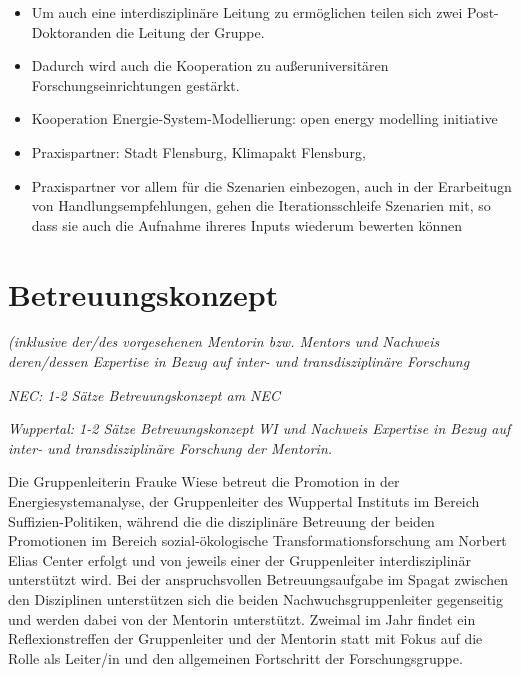 \documentclass[a4paper,11pt,twoside]{scrartcl}
\begin{document}
\begin{itemize}
 \item Um auch eine interdisziplinäre Leitung zu ermöglichen teilen sich zwei Post-Doktoranden die Leitung der Gruppe.
 \item Dadurch wird auch die Kooperation zu außeruniversitären Forschungseinrichtungen gestärkt.
 \item Kooperation Energie-System-Modellierung: open energy modelling initiative
 \item Praxispartner: Stadt Flensburg, Klimapakt Flensburg, 
 \item Praxispartner vor allem für die Szenarien einbezogen, auch in der Erarbeitugn von Handlungsempfehlungen, gehen die Iterationsschleife Szenarien mit, so dass sie auch die Aufnahme ihreres Inputs wiederum bewerten können
\end{itemize}

\section{Betreuungskonzept}
\textit{(inklusive der/des vorgesehenen Mentorin bzw. Mentors und Nachweis deren/dessen Expertise in Bezug auf inter- und transdisziplinäre Forschung}

\textit{NEC: 1-2 Sätze Betreuungskonzept am NEC}

\textit{Wuppertal: 1-2 Sätze Betreuungskonzept WI und Nachweis Expertise in Bezug auf inter- und transdisziplinäre Forschung der Mentorin.}

Die Gruppenleiterin Frauke Wiese betreut die Promotion in der Energiesystemanalyse, der Gruppenleiter des Wuppertal Instituts im Bereich Suffizien-Politiken, während die die disziplinäre Betreuung der beiden Promotionen im Bereich sozial-ökologische Transformationsforschung am Norbert Elias Center erfolgt und von jeweils einer der Gruppenleiter interdisziplinär unterstützt wird. Bei der anspruchsvollen Betreuungsaufgabe im Spagat zwischen den Disziplinen unterstützen sich die beiden Nachwuchsgruppenleiter gegenseitig und werden dabei von der Mentorin unterstützt. Zweimal im Jahr findet ein Reflexionstreffen der Gruppenleiter und der Mentorin statt mit Fokus auf die Rolle als Leiter/in und den allgemeinen Fortschritt der Forschungsgruppe. 
\end{document}
